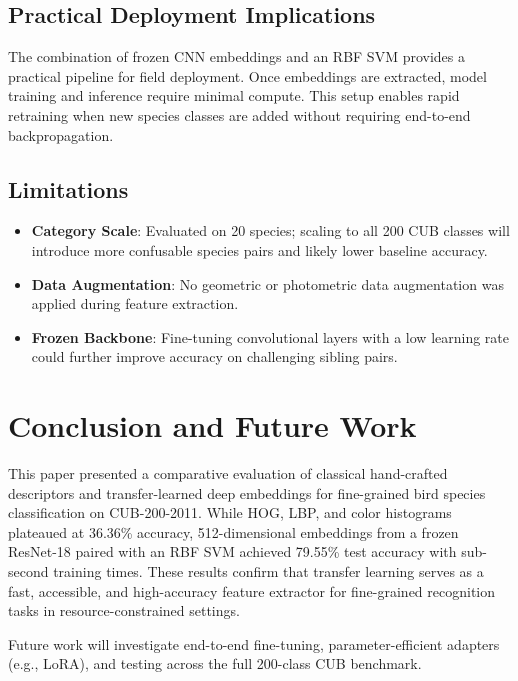 \documentclass[conference]{IEEEtran}
\begin{document}
\subsection{Practical Deployment Implications}
The combination of frozen CNN embeddings and an RBF SVM provides a practical pipeline for field deployment. Once embeddings are extracted, model training and inference require minimal compute. This setup enables rapid retraining when new species classes are added without requiring end-to-end backpropagation.

\subsection{Limitations}
\begin{itemize}
    \item \textbf{Category Scale}: Evaluated on 20 species; scaling to all 200 CUB classes will introduce more confusable species pairs and likely lower baseline accuracy.
    \item \textbf{Data Augmentation}: No geometric or photometric data augmentation was applied during feature extraction.
    \item \textbf{Frozen Backbone}: Fine-tuning convolutional layers with a low learning rate could further improve accuracy on challenging sibling pairs.
\end{itemize}

\section{Conclusion and Future Work}
\label{sec:conclusion}
This paper presented a comparative evaluation of classical hand-crafted descriptors and transfer-learned deep embeddings for fine-grained bird species classification on CUB-200-2011. While HOG, LBP, and color histograms plateaued at 36.36\% accuracy, 512-dimensional embeddings from a frozen ResNet-18 paired with an RBF SVM achieved 79.55\% test accuracy with sub-second training times. These results confirm that transfer learning serves as a fast, accessible, and high-accuracy feature extractor for fine-grained recognition tasks in resource-constrained settings.

Future work will investigate end-to-end fine-tuning, parameter-efficient adapters (e.g., LoRA), and testing across the full 200-class CUB benchmark.



\end{document}
